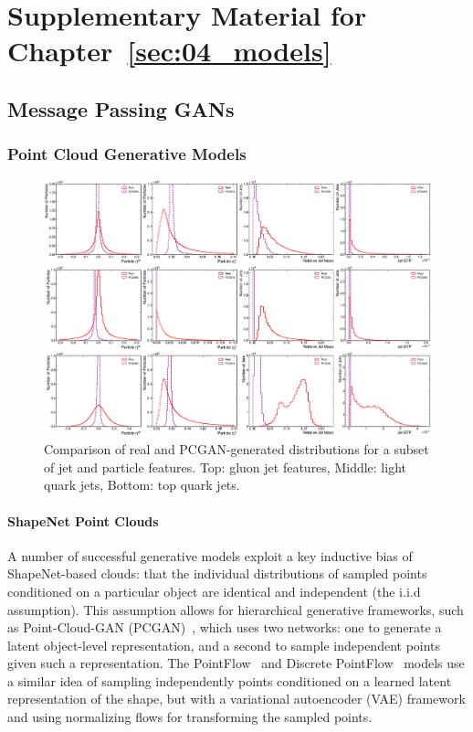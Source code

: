 \chapter{Supplementary Material for Chapter~\ref{sec:04_models}}
\label{app:04_models}

\section{Message Passing GANs}
\label{app:04_mpgan}

\subsection{Point Cloud Generative Models}
\label{app:04_mpgan_pcgen}

\begin{figure}[htpb!]
    \centering
    \centerline{\includegraphics[width=\textwidth]{figures/04-ML4Sim/mpgan/results/pcgan_feature_distributions.pdf}}
    \caption{Comparison of real and PCGAN-generated distributions for a subset of jet and particle features. Top: gluon jet features, Middle: light quark jets, Bottom: top quark jets.}
    \label{fig:04_mpgan_pcgan_results}
\end{figure}

\subsubsection{ShapeNet Point Clouds}
A number of successful generative models exploit a key inductive bias of ShapeNet-based clouds: that the individual distributions of sampled points conditioned on a particular object are identical and independent (the i.i.d assumption).
This assumption allows for hierarchical generative frameworks, such as Point-Cloud-GAN (PCGAN)~\cite{pcgan}, which uses two networks: one to generate a latent object-level representation, and a second to sample independent points given such a representation.
The PointFlow~\cite{pointflow} and Discrete PointFlow~\cite{discretepointflow} models use a similar idea of sampling independently points conditioned on a learned latent representation of the shape, but with a variational autoencoder (VAE) framework and using normalizing flows for transforming the sampled points.

